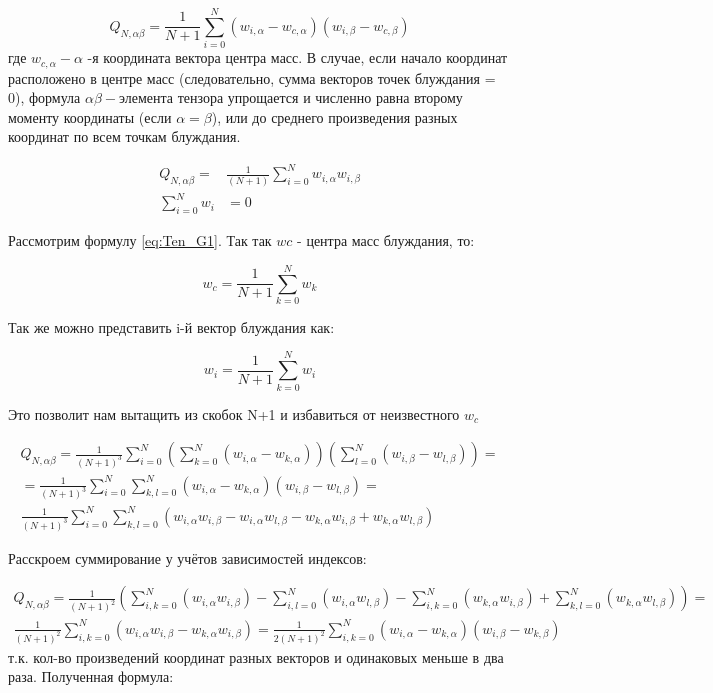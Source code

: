 \begin{equation}\label{eq:Ten_G1}
    Q_{N,\alpha\beta} = \frac{1}{N+1} \sum^{N}_{i=0}(w_{i,\alpha} - w_{c, \alpha})(w_{i,\beta} - w_{c, \beta})
\end{equation}
где $w_{c,\alpha} - \alpha$ -я координата вектора центра масс. В случае, если начало координат расположено в центре масс (следовательно, сумма векторов точек блуждания = 0), формула $\alpha\beta-$элемента тензора упрощается и численно равна второму моменту координаты (если $\alpha = \beta$), или до среднего произведения разных координат по всем точкам блуждания.


\begin{align}\label{eq:Ten_G_C}
    Q_{N,\alpha\beta} = &\frac{1}{(N+1)} \sum_{i=0}^{N} w_{i, \alpha} w_{i, \beta} \\
    \sum^{N}_{i=0}w_{i} &= 0
\end{align}

Рассмотрим формулу \eqref{eq:Ten_G1}. Так так $w{c}$ - центра масс блуждания, то:

\begin{equation}
    w_{c} = \frac{1}{N+1} \sum_{k=0}^{N} w_{k}
\end{equation}

Так же можно представить i-й вектор блуждания как:

\begin{equation}
    w_{i} = \frac{1}{N+1} \sum_{k=0}^{N} w_{i}
\end{equation}

Это позволит нам вытащить из скобок N+1 и избавиться от неизвестного $w_{c}$

\begin{align*}
    Q_{N,\alpha\beta} = \frac{1}{(N+1)^{3}} \sum^{N}_{i=0}(\sum^{N}_{k=0}(w_{i,\alpha} - w_{k, \alpha}))(\sum^{N}_{l=0}(w_{i,\beta} - w_{l, \beta})) = \\
    = \frac{1}{(N+1)^{3}} \sum^{N}_{i=0} \sum^{N}_{k,l=0}(w_{i,\alpha} - w_{k, \alpha})(w_{i,\beta} - w_{l, \beta}) = \\
    \frac{1}{(N+1)^{3}} \sum^{N}_{i=0} \sum^{N}_{k,l=0} (w_{i,\alpha} w_{i,\beta} - w_{i,\alpha} w_{l,\beta} - w_{k,\alpha} w_{i,\beta} + w_{k,\alpha} w_{l,\beta})
\end{align*}

Расскроем суммирование у учётов зависимостей индексов:

\begin{align*}
    Q_{N,\alpha\beta} = \frac{1}{(N+1)^{2}} (\sum^{N}_{i,k=0}(w_{i,\alpha} w_{i,\beta}) - \sum^{N}_{i,l=0}(w_{i,\alpha} w_{l,\beta}) - \sum^{N}_{i,k=0}(w_{k,\alpha} w_{i,\beta}) + \sum^{N}_{k,l=0}(w_{k,\alpha} w_{l,\beta})) = \\
    \frac{1}{(N+1)^{2}} \sum^{N}_{i,k=0}(w_{i,\alpha} w_{i,\beta} - w_{k,\alpha} w_{i,\beta}) = \frac{1}{2(N+1)^{2}} \sum^{N}_{i,k=0}(w_{i,\alpha} - w_{k, \alpha})(w_{i,\beta} - w_{k, \beta})
\end{align*}
т.к. кол-во произведений координат разных векторов и одинаковых меньше в два раза. Полученная формула:

